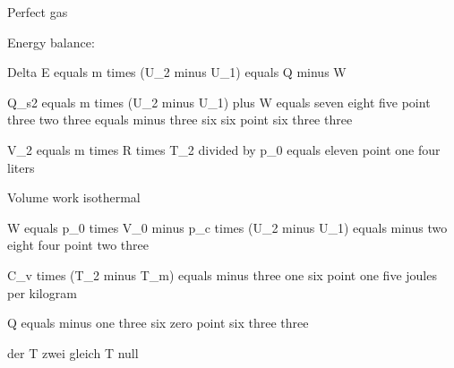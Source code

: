 Perfect gas

Energy balance:

Delta E equals m times (U_2 minus U_1) equals Q minus W

Q_s2 equals m times (U_2 minus U_1) plus W equals seven eight five point three two three equals minus three six six point six three three

V_2 equals m times R times T_2 divided by p_0 equals eleven point one four liters

Volume work isothermal

W equals p_0 times V_0 minus p_c times (U_2 minus U_1) equals minus two eight four point two three

C_v times (T_2 minus T_m) equals minus three one six point one five joules per kilogram

Q equals minus one three six zero point six three three

der T zwei gleich T null